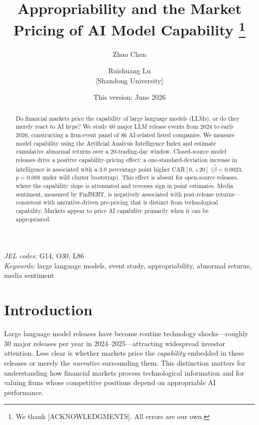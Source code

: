 \documentclass[12pt]{article}
\title{\textbf{Appropriability and the Market Pricing of AI Model Capability}%
\thanks{We thank [ACKNOWLEDGMENTS]. All errors are our own.}}
\author{Zhuo Chen \and Ruishuang Lu \\[0.5em]
\small [Shandong University]}
\date{\small This version: June 2026}
\begin{document}
\maketitle
\thispagestyle{empty}

\begin{abstract}
\noindent
Do financial markets price the capability of large language models (LLMs), or do
they merely react to AI hype? We study 60 major LLM release events from 2024 to
early 2026, constructing a firm-event panel of 86 AI-related listed companies. We
measure model capability using the Artificial Analysis Intelligence Index and
estimate cumulative abnormal returns over a 20-trading-day window. Closed-source
model releases drive a positive capability-pricing effect: a one-standard-deviation
increase in intelligence is associated with a 3.0 percentage point higher
CAR$[0,{+}20]$ ($\hat{\beta} = 0.0023$, $p = 0.008$ under wild cluster bootstrap).
This effect is absent for open-source releases, where the capability slope is
attenuated and reverses sign in point estimates. Media sentiment, measured by
FinBERT, is negatively associated with post-release returns---consistent with
narrative-driven pre-pricing that is distinct from technological capability.
Markets appear to price AI capability primarily when it can be appropriated.
\end{abstract}

\medskip
\noindent\textit{JEL codes:} G14, O30, L86\\
\noindent\textit{Keywords:} large language models, event study, appropriability, abnormal returns, media sentiment

\newpage

\section{Introduction}
\label{sec:intro}

Large language model releases have become routine technology shocks---roughly 30
major releases per year in 2024--2025---attracting widespread investor attention.
Less clear is whether markets price the \emph{capability} embedded in these
releases or merely the \emph{narrative} surrounding them. This distinction matters
for understanding how financial markets process technological information and for
valuing firms whose competitive positions depend on appropriable AI performance.
\end{document}
